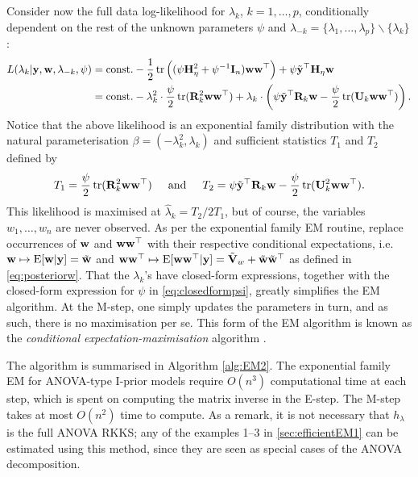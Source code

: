 Consider now the full data log-likelihood for $\lambda_k$, $k=1,\dots,p$, conditionally dependent on the rest of the unknown parameters $\psi$ and $\lambda_{-k} = \{\lambda_1,\dots,\lambda_p\} \backslash \{ \lambda_k \}$:
\begin{align}
  L(\lambda_k|\by,\bw,\lambda_{-k},\psi)
  &= \const 
  - \half \tr \Big( (
  \psi\bH_\eta^2 + \psi^{-1}\bI_n
  )\bw\bw^\top \Big)
  + \psi \tilde\by^\top \bH_\eta \bw \label{eq:logliklambdak} \\
  &= \const 
  - \lambda_k^2 \cdot \half[\psi] \tr(\bR_k^2 \bw\bw^\top)
  + \lambda_k \cdot \left( 
  \psi \tilde\by^\top \bR_k \bw - \half[\psi] \tr(\bU_k \bw\bw^\top)
  \right). \nonumber
\end{align}
Notice that the above likelihood is an exponential family distribution with the natural parameterisation $\beta = (-\lambda_k^2, \lambda_k)$ and sufficient statistics $T_1$ and $T_2$ defined by
\[
  T_1 = \half[\psi] \tr(\bR_k^2 \bw\bw^\top)
  \hspace{0.5cm}\text{and}\hspace{0.5cm}
  T_2 =  \psi\tilde\by^\top \bR_k \bw - \half[\psi]\tr(\bU_k^2 \bw\bw^\top).
\]
This likelihood is maximised at $\hat\lambda_k = T_2/2T_1$, but of course, the variables $w_1,\dots,w_n$ are never observed.
As per the exponential family EM routine, replace occurrences of $\bw$ and $\bw\bw^\top$ with their respective conditional expectations, i.e. $\bw\mapsto\E[\bw|\by] = \wtilde$ and $\bw\bw^\top\mapsto\E[\bw\bw^\top|\by] = \tilde\bV_w + \wtilde\wtilde^\top$ as defined in \eqref{eq:posteriorw}.
That the $\lambda_k$'s have closed-form expressions, together with the closed-form expression for $\psi$ in \eqref{eq:closedformpsi}, greatly simplifies the EM algorithm.
At the M-step, one simply updates the parameters in turn, and as such, there is no maximisation per se.
This form of the EM algorithm is known as the \emph{conditional expectation-maximisation} algorithm \citep{meng1993maximum}.

The algorithm is summarised in Algorithm \ref{alg:EM2}.
The exponential family EM for ANOVA-type I-prior models require $O(n^3)$ computational time at each step, which is spent on computing the matrix inverse in the E-step.
The M-step takes at most $O(n^2)$ time to compute.
As a remark, it is not necessary that $h_\lambda$ is the full ANOVA RKKS; any of the examples 1--3 in \autoref{sec:efficientEM1} can be estimated using this method, since they are seen as special cases of the ANOVA decomposition.


